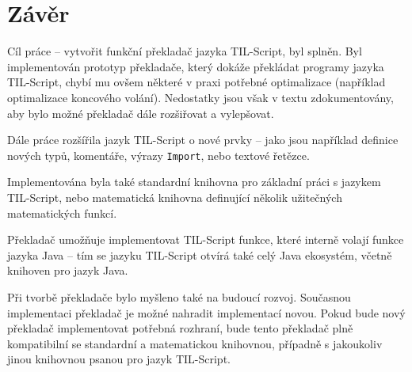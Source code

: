 \chapter{Závěr}

Cíl práce -- vytvořit funkční překladač jazyka TIL-Script, byl splněn. Byl implementován prototyp
překladače, který dokáže překládat programy jazyka TIL-Script, chybí mu ovšem některé v praxi
potřebné optimalizace (například optimalizace koncového volání). Nedostatky jsou však v textu
zdokumentovány, aby bylo možné překladač dále rozšiřovat a vylepšovat.

Dále práce rozšířila jazyk TIL-Script o nové prvky -- jako jsou například definice nových typů,
komentáře, výrazy \lstinline{Import}, nebo textové řetězce.

Implementována byla také standardní knihovna pro základní práci s jazykem TIL-Script, nebo
matematická knihovna definující několik užitečných matematických funkcí.

Překladač umožňuje implementovat TIL-Script funkce, které interně volají funkce jazyka Java -- tím
se jazyku TIL-Script otvírá také celý Java ekosystém, včetně knihoven pro jazyk Java.

Při tvorbě překladače bylo myšleno také na budoucí rozvoj. Současnou implementaci překladač je možné
nahradit implementací novou. Pokud bude nový překladač implementovat potřebná rozhraní, bude tento
překladač plně kompatibilní se standardní a matematickou knihovnou, případně s jakoukoliv jinou
knihovnou psanou pro jazyk TIL-Script.

\endinput
